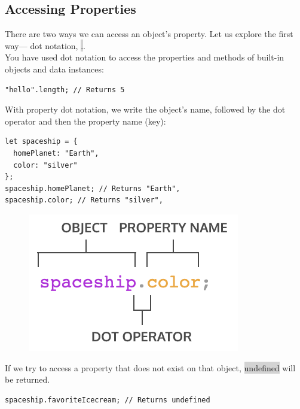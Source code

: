 \documentclass[11pt]{article}
\begin{document}
\subsection{Accessing Properties}
There are two ways we can access an object’s property. Let us explore the first way— dot notation, \colorbox{lightgray}{.}. \\
\newline
You have used dot notation to access the properties and methods of built-in objects and data instances:
\begin{lstlisting}
"hello".length; // Returns 5
\end{lstlisting}
With property dot notation, we write the object’s name, followed by the dot operator and then the property name (key): 
\begin{lstlisting}
let spaceship = {
  homePlanet: "Earth",
  color: "silver"
};
spaceship.homePlanet; // Returns "Earth",
spaceship.color; // Returns "silver",
\end{lstlisting}
\begin{figure}[H]
\includegraphics[scale = 0.7]{10_2}
\centering
\end{figure}
If we try to access a property that does not exist on that object, \colorbox{lightgray}{undefined} will be returned.
\begin{lstlisting}
spaceship.favoriteIcecream; // Returns undefined
\end{lstlisting}
\end{document}
